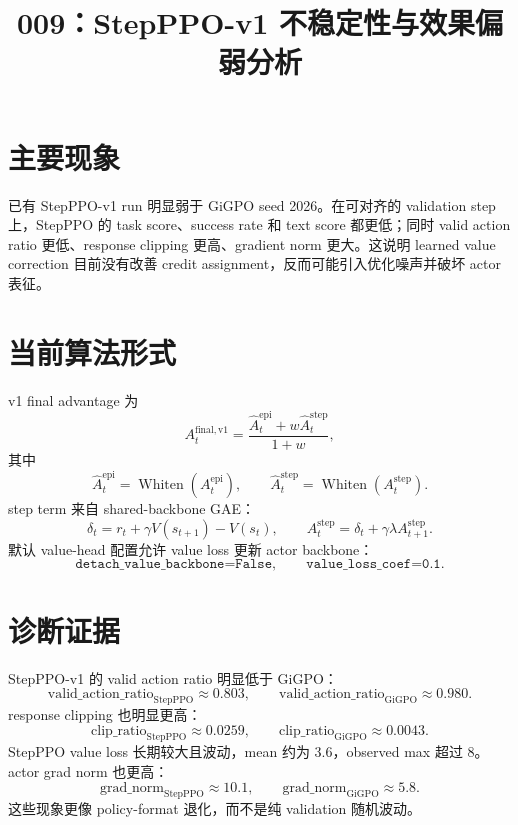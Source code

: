 \documentclass[10pt]{ctexart}
\title{009：StepPPO-v1 不稳定性与效果偏弱分析}
\author{}
\date{}
\newcommand{\Whiten}{\operatorname{Whiten}}
\begin{document}
\maketitle
\vspace{-1.2em}

\section*{主要现象}
已有 StepPPO-v1 run 明显弱于 GiGPO seed 2026。在可对齐的 validation step 上，StepPPO 的 task score、success rate 和 text score 都更低；同时 valid action ratio 更低、response clipping 更高、gradient norm 更大。这说明 learned value correction 目前没有改善 credit assignment，反而可能引入优化噪声并破坏 actor 表征。

\section*{当前算法形式}
v1 final advantage 为
\[
A_t^{\mathrm{final,v1}}
=\frac{\widehat A_t^{\mathrm{epi}}+w\widehat A_t^{\mathrm{step}}}{1+w},
\]
其中
\[
\widehat A_t^{\mathrm{epi}}=\Whiten(A_t^{\mathrm{epi}}),
\qquad
\widehat A_t^{\mathrm{step}}=\Whiten(A_t^{\mathrm{step}}).
\]
step term 来自 shared-backbone GAE：
\[
\delta_t=r_t+\gamma V(s_{t+1})-V(s_t),
\qquad
A_t^{\mathrm{step}}=\delta_t+\gamma\lambda A_{t+1}^{\mathrm{step}}.
\]
默认 value-head 配置允许 value loss 更新 actor backbone：
\[
\texttt{detach\_value\_backbone=False},
\qquad
\texttt{value\_loss\_coef=0.1}.
\]

\section*{诊断证据}
StepPPO-v1 的 valid action ratio 明显低于 GiGPO：
\[
\mathrm{valid\_action\_ratio}_{\mathrm{StepPPO}}\approx0.803,
\qquad
\mathrm{valid\_action\_ratio}_{\mathrm{GiGPO}}\approx0.980.
\]
response clipping 也明显更高：
\[
\mathrm{clip\_ratio}_{\mathrm{StepPPO}}\approx0.0259,
\qquad
\mathrm{clip\_ratio}_{\mathrm{GiGPO}}\approx0.0043.
\]
StepPPO value loss 长期较大且波动，mean 约为 $3.6$，observed max 超过 $8$。actor grad norm 也更高：
\[
\mathrm{grad\_norm}_{\mathrm{StepPPO}}\approx10.1,
\qquad
\mathrm{grad\_norm}_{\mathrm{GiGPO}}\approx5.8.
\]
这些现象更像 policy-format 退化，而不是纯 validation 随机波动。
\end{document}
